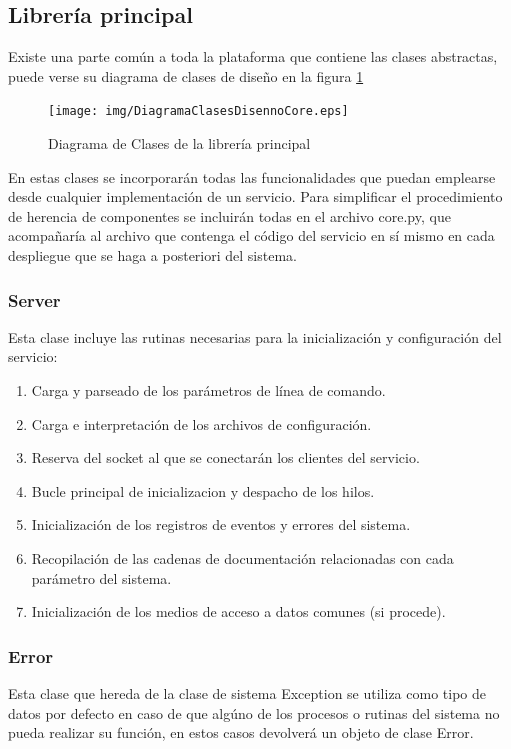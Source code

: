 \documentclass[a4paper,spanish,12pt]{book}
\begin{document}
\subsection{Librería principal}
Existe una parte común a toda la plataforma que contiene las clases abstractas, puede verse su diagrama de clases de diseño en la figura \ref{fig:DiagramaClasesDiseñoCore}

\begin{figure}[h]
	\texttt{[image: img/DiagramaClasesDisennoCore.eps]}
	\caption{Diagrama de Clases de la librería principal} 
	      \label{fig:DiagramaClasesDiseñoCore}
\end{figure}

En estas clases se incorporarán todas las funcionalidades que puedan emplearse desde cualquier implementación de un servicio. Para simplificar el procedimiento de herencia de componentes se incluirán todas en el archivo core.py, que acompañaría al archivo que contenga el código del servicio en sí mismo en cada despliegue que se haga a posteriori del sistema.
\subsubsection{Server}
Esta clase incluye las rutinas necesarias para la inicialización y configuración del servicio:
\begin{enumerate}
	\item Carga y parseado de los parámetros de línea de comando.
	\item Carga e interpretación de los archivos de configuración.
	\item Reserva del socket al que se conectarán los clientes del servicio.
	\item Bucle principal de inicializacion y despacho de los hilos.	
	\item Inicialización de los registros de eventos y errores del sistema.
	\item Recopilación de las cadenas de documentación relacionadas con cada parámetro del sistema.
	\item Inicialización de los medios de acceso a datos comunes (si procede). 
\end{enumerate}
\subsubsection{Error}
Esta clase que hereda de la clase de sistema Exception se utiliza como tipo de datos por defecto en caso de que algúno de los procesos o rutinas del sistema no pueda realizar su función, en estos casos devolverá un objeto de clase Error.
\end{document}
